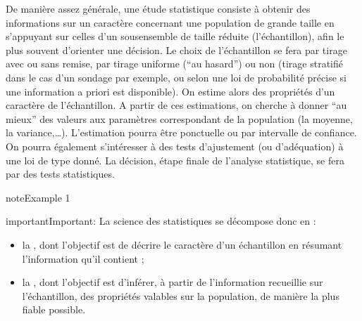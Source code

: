 \documentclass[letterpaper,10pt,english]{jupyterBook}
\begin{document}
\begin{DUlineblock}{0em}
\item[] 
\end{DUlineblock}

\sphinxAtStartPar
De manière assez générale, une étude statistique consiste à obtenir des informations sur un caractère concernant une population de grande taille en s’appuyant sur celles d’un sous\sphinxhyphen{}ensemble de taille réduite (l’échantillon), afin le plus souvent d’orienter une décision. Le choix de l’échantillon se fera par tirage avec ou sans remise, par tirage uniforme (“au hasard”) ou non (tirage stratifié dans le cas d’un sondage par exemple, ou selon une loi de probabilité précise si une information a priori est disponible).
On estime alors des propriétés d’un caractère de l’échantillon. A partir de ces estimations, on cherche à donner “au mieux” des valeurs aux paramètres correspondant de la population (la moyenne, la variance,…). L’estimation pourra être ponctuelle ou par intervalle de confiance. On pourra également s’intéresser à des tests d’ajustement (ou d’adéquation) à une loi de type donné. La décision, étape finale de l’analyse statistique, se fera par des tests statistiques.
\label{intro:example-0}
\begin{sphinxadmonition}{note}{Example 1}
\end{sphinxadmonition}

\begin{sphinxadmonition}{important}{Important:}
\ignorespaces 
{}\ignorespaces 
\sphinxAtStartPar
La science des statistiques se décompose donc en :
\begin{itemize}
\item {} 
\sphinxAtStartPar
la , dont l’objectif est de décrire le caractère d’un échantillon en résumant l’information qu’il contient ;

\item {} 
\sphinxAtStartPar
la , dont l’objectif est d’inférer, à partir de l’information recueillie sur l’échantillon, des propriétés valables sur la population, de manière la plus fiable possible.

\end{itemize}
\end{sphinxadmonition}
\end{document}
